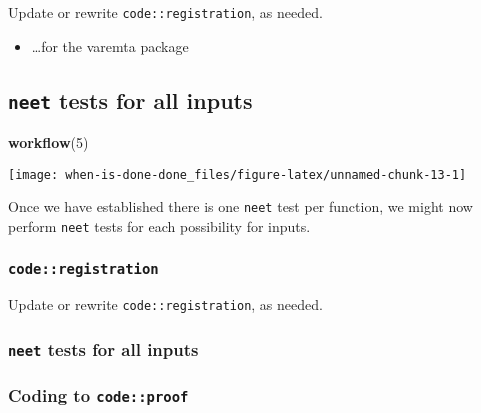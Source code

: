 \documentclass[
]{article}
\newenvironment{Shaded}{\begin{snugshade}}{\end{snugshade}}
\newcommand{\DecValTok}[1]{\textcolor[rgb]{0.00,0.00,0.81}{#1}}
\newcommand{\KeywordTok}[1]{\textcolor[rgb]{0.13,0.29,0.53}{\textbf{#1}}}
\newcommand{\NormalTok}[1]{#1}
\providecommand{\tightlist}{%
  \setlength{\itemsep}{0pt}\setlength{\parskip}{0pt}}
\begin{document}
Update or rewrite \texttt{code::registration}, as needed.

\begin{itemize}
\tightlist
\item
  \ldots for the varemta package
\end{itemize}

\hypertarget{neet-tests-for-all-inputs}{%
\subsection{\texorpdfstring{\texttt{neet} tests for all
inputs}{neet tests for all inputs}}\label{neet-tests-for-all-inputs}}

\begin{Shaded}
\begin{Highlighting}[]
\KeywordTok{workflow}\NormalTok{(}\DecValTok{5}\NormalTok{)}
\end{Highlighting}
\end{Shaded}

\begin{center}\texttt{[image: when-is-done-done\_files/figure-latex/unnamed-chunk-13-1]} \end{center}

Once we have established there is one \texttt{neet} test per function,
we might now perform \texttt{neet} tests for each possibility for
inputs.

\hypertarget{coderegistration-3}{%
\subsubsection{\texorpdfstring{\texttt{code::registration}}{code::registration}}\label{coderegistration-3}}

Update or rewrite \texttt{code::registration}, as needed.

\hypertarget{neet-tests-for-all-inputs-1}{%
\subsubsection{\texorpdfstring{\texttt{neet} tests for all
inputs}{neet tests for all inputs}}\label{neet-tests-for-all-inputs-1}}

\hypertarget{coding-to-codeproof-1}{%
\subsubsection{\texorpdfstring{Coding to
\texttt{code::proof}}{Coding to code::proof}}\label{coding-to-codeproof-1}}
\end{document}
